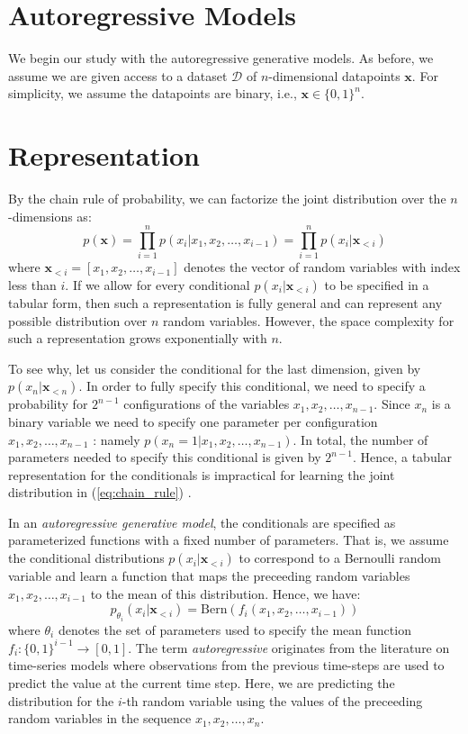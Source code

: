 \section{Autoregressive Models}

We begin our study with the autoregressive generative models. As before, we assume we are given access to a dataset $\mathcal{D}$  of $n$-dimensional datapoints $\mathbf{x}$. For simplicity, we assume the datapoints are binary, i.e.,  $\mathbf{x} \in \{0,1\}^n$.

\section{Representation}

By the chain rule of probability, we can factorize the joint distribution over the $n$-dimensions as:
\[
\begin{equation}
p(\mathbf{x}) = \prod\limits_{i=1}^{n}p(x_i \vert x_1, x_2, \ldots, x_{i-1}) = \prod\limits_{i=1}^{n} p(x_i \vert \mathbf{x}_{<i})
\end{equation}
\label{eq:chain_rule}
\]
where $\mathbf{x}_{<i}=[x_1, x_2, \ldots, x_{i-1}]$ denotes the vector of random variables with index less than $i$. If we allow for every conditional $p(x_i \vert \mathbf{x}_{<i})$ to be specified in a tabular form, then such a representation is fully general and can represent any possible distribution over $n$ random variables. However, the space complexity for such a representation grows exponentially with $n$. 

To see why, let us consider the conditional for the last dimension, given by $p(x_n \vert \mathbf{x}_{<n})$. In order to fully specify this conditional, we need to specify a probability for $2^{n-1}$ configurations of the variables $x_1, x_2, \ldots, x_{n-1}$.  Since $x_n$ is a binary variable we need to specify one parameter per configuration $x_1, x_2, \ldots, x_{n-1}$ : namely $p(x_n = 1 | x_1, x_2, \ldots, x_{n-1})$. In total, the number of parameters needed to specify this conditional is given by $2^{n-1}$. Hence, a tabular representation for the conditionals is impractical for learning the joint distribution in (\ref{eq:chain_rule}) . 

In an \textit{autoregressive generative model}, the conditionals are specified as parameterized functions with a fixed number of parameters. That is, we assume the conditional distributions $p(x_i \vert \mathbf{x}_{<i})$ to correspond to a Bernoulli random variable and learn a function that maps the preceeding random variables $x_1, x_2, \ldots, x_{i-1}$ to the mean of this distribution. Hence, we have:
\[
p_{\theta_i}(x_i \vert \mathbf{x}_{<i}) = \mathrm{Bern}(f_i(x_1, x_2, \ldots, x_{i-1}))
\]
where $\theta_i$ denotes the set of parameters used to specify the mean function $f_i: \{0,1\}^{i-1}\rightarrow [0,1]$.  The term \textit{autoregressive} originates from the literature on time-series models where observations from the previous time-steps are used to predict the value at the current time step. Here, we are predicting the distribution for the $i$-th random variable using the values of the preceeding random variables in the sequence $x_1, x_2, \ldots, x_n$.

